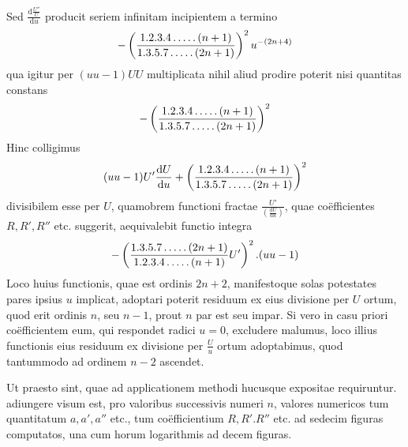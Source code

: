 Sed $\frac{\mathrm{d}\frac{U''}U}{\mathrm{d}u}$ producit
seriem infinitam incipientem a termino
\[
-\left(\frac{1.2.3.4\mathinner{.\,.\,.\,.\,.}(n+1)}
{1.3.5.7\mathinner{.\,.\,.\,.\,.}(2n+1)}\right)^2u^{-(2n+4)}
\]
qua igitur per $(uu-1)UU$ multiplicata nihil aliud prodire
poterit nisi quantitas constans
\[
-\left(\frac{1.2.3.4\mathinner{.\,.\,.\,.\,.}(n+1)}
{1.3.5.7\mathinner{.\,.\,.\,.\,.}(2n+1)}\right)^2
\]
Hinc colligimus
\[
(uu-1)U'\frac{\mathrm{d}U}{\mathrm{d}u}
+\left(\frac{1.2.3.4\mathinner{.\,.\,.\,.\,.}(n+1)}
{1.3.5.7\mathinner{.\,.\,.\,.\,.}(2n+1)}\right)^2
\]
divisibilem esse per $U$, quamobrem functioni fractae
$\frac{U'}{(\frac{\mathrm{d}U}{\mathrm{d}u})}$,
quae coëfficientes $R,R',R''$ etc. suggerit,
aequivalebit functio integra
\[
-\left(\frac{1.3.5.7\mathinner{.\,.\,.\,.\,.}(2n+1)}
{1.2.3.4\mathinner{.\,.\,.\,.\,.}(n+1)}U'\right)^2.(uu-1)
\]
Loco huius functionis, quae est ordinis $2n+2$, manifestoque
solas potestates pares ipsius $u$ implicat, adoptari poterit
residuum ex eius divisione per $U$ ortum, quod erit ordinis $n$,
seu $n-1$, prout $n$ par est seu impar. Si vero in casu priori
coëfficientem eum, qui respondet radici $u=0$, excludere malumus,
loco illius functionis eius residuum ex divisione per $\frac Uu$
ortum adoptabimus, quod tantummodo ad ordinem $n-2$ ascendet.

Ut praesto sint, quae ad applicationem methodi hucusque expositae
requiruntur. adiungere visum est, pro valoribus successivis
numeri $n$, valores numericos tum quantitatum $a,a',a''$ etc.,
tum coëfficientium $R,R'.R''$ etc. ad sedecim figuras
computatos, una cum horum logarithmis ad decem figuras.
